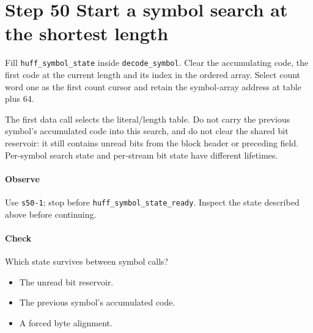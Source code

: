 \section{Step 50 Start a symbol search at the shortest length}\label{png-huff-s50}
Fill \texttt{huff\_symbol\_state} inside \texttt{decode\_symbol}. Clear the accumulating code, the first code at the current length and its index in the ordered array. Select count word one as the first count cursor and retain the symbol-array address at table plus 64.

The first data call selects the literal/length table. Do not carry the previous symbol's accumulated code into this search, and do not clear the shared bit reservoir: it still contains unread bits from the block header or preceding field. Per-symbol search state and per-stream bit state have different lifetimes.

\paragraph{Observe} Use \texttt{s50-1}; stop before \texttt{huff\_symbol\_state\_ready}. Inspect the state described above before continuing.

\paragraph{Check} Which state survives between symbol calls?
\begin{itemize}
  \item[A.] The unread bit reservoir.
  \item[B.] The previous symbol’s accumulated code.
  \item[C.] A forced byte alignment.
\end{itemize}
